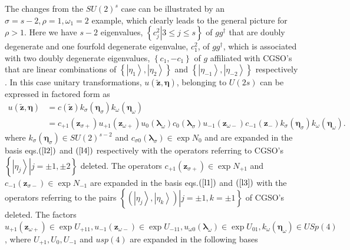 \documentclass[aps,preprint]{revtex4}%
\begin{document}
The changes from the $SU\left(  2\right)  ^{s}$ case can be illustrated by an
$\sigma=s-2,\rho=1,\omega_{1}=2$ example, which clearly leads to the general
picture for $\rho>1$. Here we have $s-2$ eigenvalues, $\left\{  \left.
c_{j}^{2}\right\vert 3\leq j\leq s\right\}  $ of $gg^{\dag}$ that are doubly
degenerate and one fourfold degenerate eigenvalue, $c_{1}^{2}$, of $gg^{\dag}%
$, which is associated with two doubly degenerate eigenvalues, $\left\{
c_{1},-c_{1}\right\}  $ of $g$ affiliated with CGSO's that are linear
combinations of $\left\{  \left\vert \eta_{1}\right\rangle ,\left\vert
\eta_{2}\right\rangle \right\}  $ and $\left\{  \left\vert \eta_{-1}%
\right\rangle ,\left\vert \eta_{-2}\right\rangle \right\}  $ respectively
\cite{Weiner&ortiz04}. In this case unitary transformations, $u\left(
\mathbf{\tilde{z},\eta}\right)  $, belonging to $U\left(  2s\right)  $ can be
expressed in factored form as
\begin{align}
u\left(  \mathbf{\tilde{z},\eta}\right)   &  =c\left(  \mathbf{\tilde{z}%
}\right)  k_{\sigma}\left(  \mathbf{\eta}_{\sigma}\right)  k_{\omega}\left(
\mathbf{\eta}_{\omega}\right) \nonumber\\
&  =c_{+1}\left(  \mathbf{z}_{\sigma+}\right)  u_{+1}\left(  \mathbf{z}%
_{\omega+}\right)  u_{0}\left(  \mathbf{\lambda}_{\omega}\right)  c_{0}\left(
\mathbf{\lambda}_{\sigma}\right)  u_{-1}\left(  \mathbf{z}_{\omega-}\right)
c_{-1}\left(  \mathbf{z}_{-}\right)  k_{\sigma}\left(  \mathbf{\eta}_{\sigma
}\right)  k_{\omega}\left(  \mathbf{\eta}_{\omega}\right)  . \label{gpprod}%
\end{align}
where $k_{\sigma}\left(  \mathbf{\eta}_{\sigma}\right)  \in SU\left(
2\right)  ^{s-2}$ and $c_{\sigma0}\left(  \mathbf{\lambda}_{\sigma}\right)
\in\exp N_{0}$ and are expanded in the basis eqs.$\left(  \ref{l2}\right)  $
and $\left(  \ref{l4}\right)  $ respectively with the operators referring to
CGSO's $\left\{  \left.  \left\vert \eta_{j}\right\rangle \right\vert
j=\pm1,\pm2\right\}  $ deleted. The operators $c_{+1}\left(  \mathbf{z}%
_{\sigma+}\right)  \in\exp N_{+1}$ and $c_{-1}\left(  \mathbf{z}_{\sigma
-}\right)  \in\exp N_{-1}$ are expanded in the basis eqs.$\left(
\ref{l1}\right)  $ and $\left(  \ref{l3}\right)  $ with the operators
referring to the pairs $\left\{  \left.  \left(  \left\vert \eta
_{j}\right\rangle ,\left\vert \eta_{k}\right\rangle \right)  \right\vert
j=\pm1,k=\pm1\right\}  $ of CGSO's deleted. The factors $u_{+1}\left(
\mathbf{z}_{\omega+}\right)  \in\exp U_{+11},u_{-1}\left(  \mathbf{z}%
_{\omega-}\right)  \in\exp U_{-11},u_{\omega0}\left(  \mathbf{\lambda}%
_{\omega}\right)  \in\exp U_{01},k_{\omega}\left(  \mathbf{\eta}_{\omega
}\right)  \in USp\left(  4\right)  $, where $U_{+1},U_{0},U_{-1}$ and
$usp\left(  4\right)  $ are expanded in the following bases%
\end{document}
